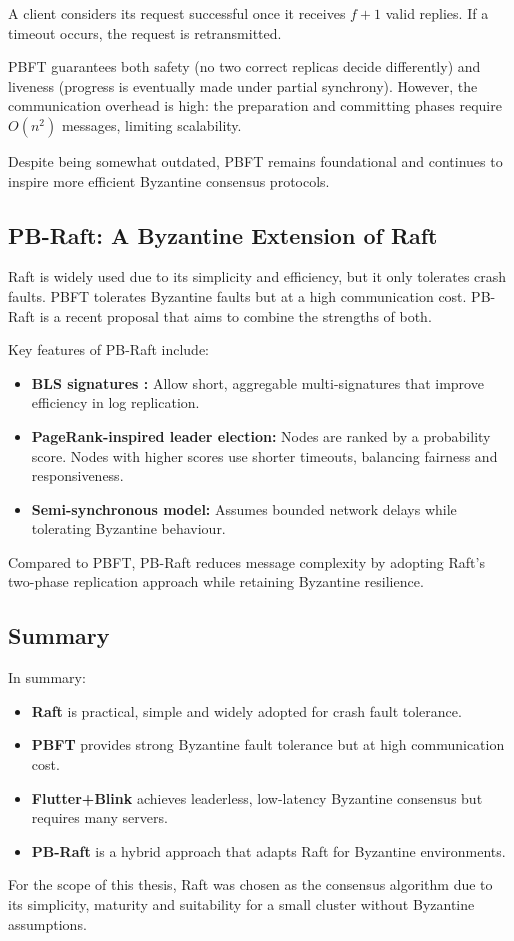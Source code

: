 A client considers its request successful once it receives $f+1$ valid replies. If a timeout occurs, the request is retransmitted.  

PBFT guarantees both safety (no two correct replicas decide differently) and liveness (progress is eventually made under partial synchrony). However, the communication overhead is high: the preparation and committing phases require $O(n^2)$ messages, limiting scalability.  

Despite being somewhat outdated, PBFT remains foundational and continues to inspire more efficient Byzantine consensus protocols.

\subsection{PB-Raft: A Byzantine Extension of Raft}

Raft is widely used due to its simplicity and efficiency, but it only tolerates crash faults. PBFT tolerates Byzantine faults but at a high communication cost.  
PB-Raft \cite{shi2025pb} is a recent proposal that aims to combine the strengths of both.

Key features of PB-Raft include:
\begin{itemize}
    \item \textbf{BLS signatures \cite{boneh2001short}:} Allow short, aggregable multi-signatures that improve efficiency in log replication.
    \item \textbf{PageRank-inspired leader election:} Nodes are ranked by a probability score. Nodes with higher scores use shorter timeouts, balancing fairness and responsiveness.
    \item \textbf{Semi-synchronous model:} Assumes bounded network delays while tolerating Byzantine behaviour.
\end{itemize}

Compared to PBFT, PB-Raft reduces message complexity by adopting Raft's two-phase replication approach while retaining Byzantine resilience.  

\subsection{Summary}

In summary:
\begin{itemize}
    \item \textbf{Raft} is practical, simple and widely adopted for crash fault tolerance.
    \item \textbf{PBFT} provides strong Byzantine fault tolerance but at high communication cost.
    \item \textbf{Flutter+Blink} achieves leaderless, low-latency Byzantine consensus but requires many servers.
    \item \textbf{PB-Raft} is a hybrid approach that adapts Raft for Byzantine environments.
\end{itemize}

For the scope of this thesis, Raft was chosen as the consensus algorithm due to its simplicity, maturity and suitability for a small cluster without Byzantine assumptions.
